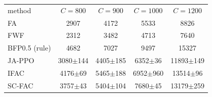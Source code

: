 \begin{tabular}{lcccc}
\hline
method & $C=800$ & $C=900$ & $C=1000$ & $C=1200$\\
FA & 2907 & 4172 & 5533 & 8826\\
FWF & 2312 & 3482 & 4713 & 7640\\
BFP0.5 (rule) & 4682 & 7027 & 9497 & 15327\\
JA-PPO & 3080$\pm$144 & 4405$\pm$185 & 6352$\pm$36 & 11893$\pm$149\\
IFAC & 4176$\pm$69 & 5465$\pm$188 & 6952$\pm$960 & 13514$\pm$96\\
SC-FAC & 3757$\pm$43 & 5404$\pm$104 & 7680$\pm$45 & 13179$\pm$259\\
\hline
\end{tabular}